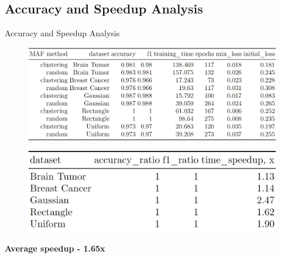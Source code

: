 \documentclass[aspectratio=169]{beamer}
\begin{document}
\subsection{Accuracy and Speedup Analysis}
\begin{frame}{Accuracy and Speedup Analysis}
\begin{figure}
    \centering
    \includegraphics[width=0.95\linewidth]{../../fig/acc_speedup_table.png}
    \label{fig:acc_speedup_table}
\end{figure}
\end{frame}

\begin{frame}
\begin{figure}
    \centering
    \includegraphics[width=1\linewidth]{../../fig/speedup_groupby.png}
\end{figure}
\textbf{Average speedup - 1.65x}
\end{frame}
\end{document}
